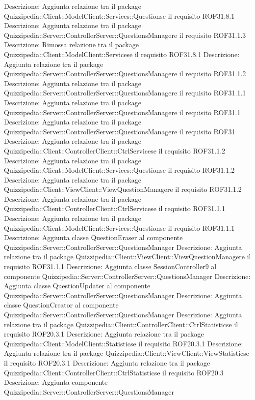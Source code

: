 Descrizione: Aggiunta relazione tra il package Quizzipedia::Client::ModelClient::Services::Questionse il requisito ROF31.8.1 
Descrizione: Aggiunta relazione tra il package Quizzipedia::Server::ControllerServer::QuestionsManagere il requisito ROF31.1.3 
Descrizione: Rimossa relazione tra il package Quizzipedia::Client::ModelClient::Servicese il requisito ROF31.8.1 
Descrizione: Aggiunta relazione tra il package Quizzipedia::Server::ControllerServer::QuestionsManagere il requisito ROF31.1.2 
Descrizione: Aggiunta relazione tra il package Quizzipedia::Server::ControllerServer::QuestionsManagere il requisito ROF31.1.1 
Descrizione: Aggiunta relazione tra il package Quizzipedia::Server::ControllerServer::QuestionsManagere il requisito ROF31.1 
Descrizione: Aggiunta relazione tra il package Quizzipedia::Server::ControllerServer::QuestionsManagere il requisito ROF31 
Descrizione: Aggiunta relazione tra il package Quizzipedia::Client::ControllerClient::CtrlServicese il requisito ROF31.1.2 
Descrizione: Aggiunta relazione tra il package Quizzipedia::Client::ModelClient::Services::Questionse il requisito ROF31.1.2 
Descrizione: Aggiunta relazione tra il package Quizzipedia::Client::ViewClient::ViewQuestionManagere il requisito ROF31.1.2 
Descrizione: Aggiunta relazione tra il package Quizzipedia::Client::ControllerClient::CtrlServicese il requisito ROF31.1.1 
Descrizione: Aggiunta relazione tra il package Quizzipedia::Client::ModelClient::Services::Questionse il requisito ROF31.1.1 
Descrizione: Aggiunta classe QuestionEraser al componente Quizzipedia::Server::ControllerServer::QuestionsManager 
Descrizione: Aggiunta relazione tra il package Quizzipedia::Client::ViewClient::ViewQuestionManagere il requisito ROF31.1.1 
Descrizione: Aggiunta classe SessionController9 al componente Quizzipedia::Server::ControllerServer::QuestionsManager 
Descrizione: Aggiunta classe QuestionUpdater al componente Quizzipedia::Server::ControllerServer::QuestionsManager 
Descrizione: Aggiunta classe QuestionCreator al componente Quizzipedia::Server::ControllerServer::QuestionsManager 
Descrizione: Aggiunta relazione tra il package Quizzipedia::Client::ControllerClient::CtrlStatisticse il requisito ROF20.3.1 
Descrizione: Aggiunta relazione tra il package Quizzipedia::Client::ModelClient::Statisticse il requisito ROF20.3.1 
Descrizione: Aggiunta relazione tra il package Quizzipedia::Client::ViewClient::ViewStatisticse il requisito ROF20.3.1 
Descrizione: Aggiunta relazione tra il package Quizzipedia::Client::ControllerClient::CtrlStatisticse il requisito ROF20.3 
Descrizione: Aggiunta componente Quizzipedia::Server::ControllerServer::QuestionsManager 
